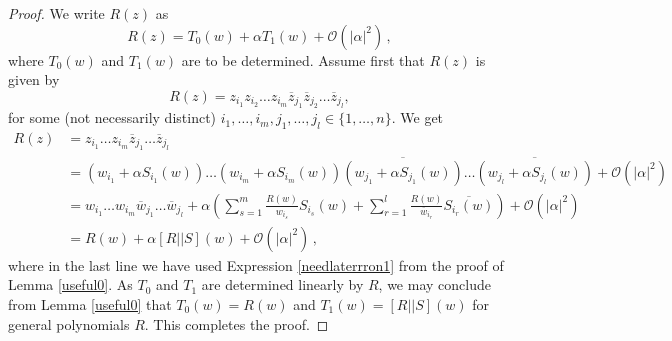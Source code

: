 \documentclass[12pt]{article}
\renewcommand{\mathcal}{\mathscr}
\theoremstyle{plain}
\theoremstyle{definition}
\theoremstyle{remark}
\theoremstyle{remark}
\begin{document}
\begin{proof}
We write $R(z)$ as 
\begin{equation}
    R(z) = T_0(w) + \alpha T_1(w) +  \mathcal{O}(|\alpha|^2) \, ,
\end{equation}
where $T_0(w)$ and $T_1(w)$ are to be determined. Assume first that $R(z)$ is given by 
\[R(z) = z_{i_1}z_{i_2}\dots z_{i_m}\overline{z}_{j_1}\overline{z}_{j_2}\dots\overline{z}_{j_l} ,  \]
for some (not necessarily distinct) $i_1, \dots, i_m, j_1, \dots, j_l \in \{1, \dots, n\}$. We get
\begin{align}
    R(z) &= z_{i_1}\dots z_{i_m}\overline{z}_{j_1}\dots\overline{z}_{j_l} \\ \nonumber
    &= (w_{i_1}+\alpha S_{i_1}(w))\dots (w_{i_m}+\alpha S_{i_m}(w)) \overline{(w_{j_1}+\alpha S_{j_1}(w))}\dots\overline{(w_{j_l}+\alpha S_{j_l}(w))} + \mathcal{O}(|\alpha|^2) \\ \nonumber
    &= w_{i_1}\dots w_{i_m}\overline{w}_{j_1}\dots\overline{w}_{j_l} + \alpha \left( \sum_{s=1}^m\frac{R(w)}{w_{i_s}}S_{i_s}(w) + \sum_{r=1}^l\frac{R(w)}{\overline{w}_{i_r}}\overline{S_{i_r}(w)} \right) + \mathcal{O}(|\alpha|^2) \\ \nonumber
    &= R(w) + \alpha [R||S](w) + \mathcal{O}(|\alpha|^2)\, ,
\end{align}
where in the last line we have used Expression \eqref{needlaterrron1} from the proof of Lemma \ref{useful0}. As $T_0$ and $T_1$ are determined linearly by $R$, we may conclude from Lemma \ref{useful0} that $T_0(w) = R(w)$ and $T_1(w) = [R||S](w)$ for general polynomials $R$. This completes the proof.
\end{proof}
\end{document}
